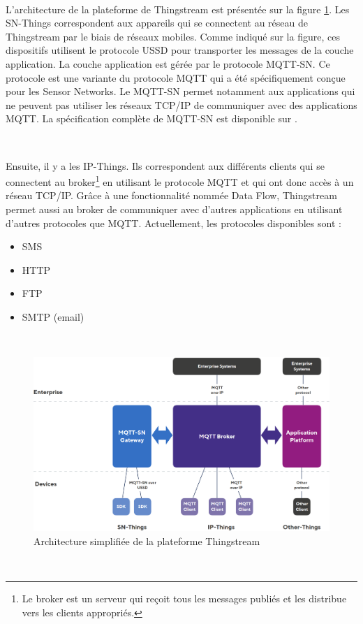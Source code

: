 ~

\noindent
L’architecture de la plateforme de Thingstream est présentée sur la figure \ref{fig:thing_archi}. Les SN-Things correspondent aux appareils qui se connectent au réseau de Thingstream par le biais de réseaux mobiles. Comme indiqué sur la figure, ces dispositifs utilisent le protocole USSD pour transporter les messages de la couche application. La couche application est gérée par le protocole MQTT-SN. Ce protocole est une variante du protocole MQTT qui a été spécifiquement conçue pour les Sensor Networks. Le MQTT-SN permet notamment aux applications qui ne peuvent pas utiliser les réseaux TCP/IP de communiquer avec des applications MQTT. La spécification complète de MQTT-SN est disponible sur \cite{stanford2013mqtt}.


~

\noindent
Ensuite, il y a les IP-Things. Ils correspondent aux différents clients qui se connectent au broker\footnote{Le broker est un serveur qui reçoit tous les messages publiés et les distribue vers les clients appropriés.} en utilisant le protocole MQTT et qui ont donc accès à un réseau TCP/IP. Grâce à une fonctionnalité nommée Data Flow, Thingstream permet aussi au broker de communiquer avec d’autres applications en utilisant d’autres protocoles que MQTT. Actuellement, les protocoles disponibles sont :

\begin{itemize}
  \item SMS
  \item HTTP
  \item FTP
  \item SMTP (email)
\end{itemize}

~

\begin{figure}[ht!]
  \includegraphics[width=\textwidth]{img/el_prototype/thingstream_archi.png}
  \caption{Architecture simplifiée de la plateforme Thingstream \cite{thing_archi}}
  \label{fig:thing_archi}
\end{figure}
~

